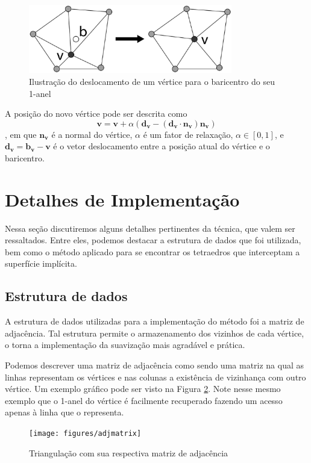 \documentclass[11pt]{article}
\begin{document}
			\begin{figure}[h]
				\centering
				\includegraphics[height=3cm]{figures/baricentro.eps}
				\caption{Ilustração do deslocamento de um vértice para o baricentro do seu 1-anel}
				\label{fig:baricentro}
			\end{figure}

			A posição do novo vértice pode ser descrita como $$ \mathbf{v} = \mathbf{v} + \alpha (\mathbf{d_v} - (\mathbf{d_v} \cdot \mathbf{n_v})\mathbf{n_v} )$$, em que $\mathbf{n_v}$ é a normal do vértice, $\alpha$ é um fator de relaxação, $\alpha \in [0,1]$, e $\mathbf{d_v} = \mathbf{b_v} - \mathbf{v}$ é o vetor deslocamento entre a posição atual do vértice e o baricentro.
			

	\section{Detalhes de Implementação} %
	\label{sec:detalhes}
		Nessa seção discutiremos alguns detalhes pertinentes da técnica, que valem ser ressaltados. Entre eles, podemos destacar a estrutura de dados que foi utilizada, bem como o método aplicado para se encontrar os tetraedros que interceptam a superfície implícita.

		\subsection{Estrutura de dados} %
		\label{sub:estrutura}
			A estrutura de dados utilizadas para a implementação do método foi a matriz de adjacência. Tal estrutura permite o armazenamento dos vizinhos de cada vértice, o torna a implementação da suavização mais agradável e prática.

			Podemos descrever uma matriz de adjacência como sendo uma matriz na qual as linhas representam os vértices e nas colunas a existência de vizinhança com outro vértice. Um exemplo gráfico pode ser visto na Figura \ref{fig:adjmatrix}. Note nesse mesmo exemplo que o 1-anel do vértice é facilmente recuperado fazendo um acesso apenas à linha que o representa.

			\begin{figure}[h]
				\texttt{[image: figures/adjmatrix]}
				\caption{Triangulação com sua respectiva matriz de adjacência}
				\label{fig:adjmatrix}
			\end{figure}
		
\end{document}

